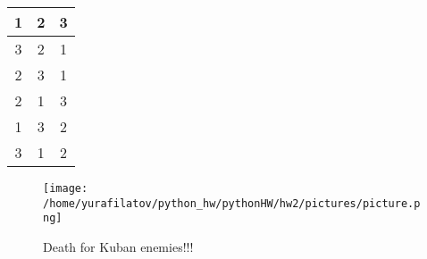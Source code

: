 \documentclass{article}
\begin{document}
    \begin{tabular}{|c|c|c|}
\hline
1 & 2 & 3 \\
\hline
3 & 2 & 1 \\
\hline
2 & 3 & 1 \\
\hline
2 & 1 & 3 \\
\hline
1 & 3 & 2 \\
\hline
3 & 1 & 2 \\
\hline
\end{tabular}
    \bigskip
    \begin{figure}
\centering
\texttt{[image: /home/yurafilatov/python\_hw/pythonHW/hw2/pictures/picture.png]}
\caption{Death for Kuban enemies!!!}
\end{figure}
    
\end{document}
